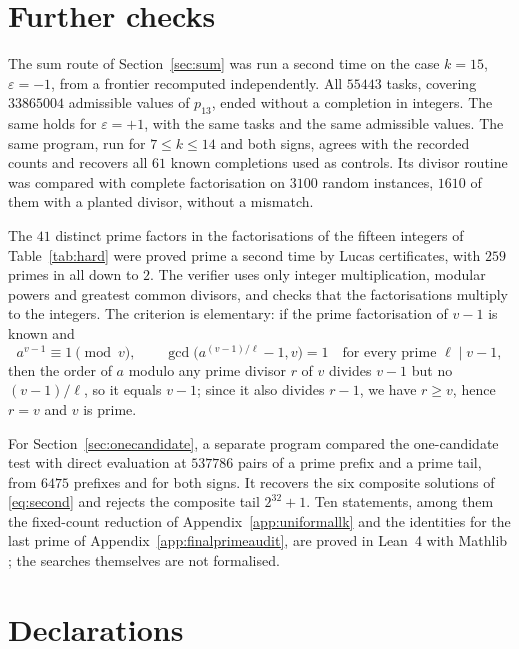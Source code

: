 \documentclass[11pt,reqno]{amsart}
\numberwithin{equation}{section}
\theoremstyle{plain}
\theoremstyle{definition}
\theoremstyle{remark}
\begin{document}
\section{Further checks}\label{app:revisionchecks}
The sum route of Section~\ref{sec:sum} was run a second time on the
case $k=15$, $\varepsilon=-1$, from a frontier recomputed independently.
All $55443$ tasks, covering $33865004$ admissible values of $p_{13}$,
ended without a completion in integers. The same holds for
$\varepsilon=+1$, with the same tasks and the same admissible values.
The same program, run for $7\le k\le14$ and both signs, agrees with
the recorded counts and recovers all $61$ known completions used as
controls. Its
divisor routine was compared with complete factorisation on $3100$
random instances, $1610$ of them with a planted divisor, without a
mismatch.

The $41$ distinct prime factors in the factorisations of the fifteen
integers of Table~\ref{tab:hard} were proved prime a second time by
Lucas certificates, with $259$ primes in all down to $2$. The verifier
uses only integer multiplication, modular powers and greatest common
divisors, and checks that the factorisations multiply to the
integers. The criterion is elementary: if the prime factorisation of
$v-1$ is known and
\[
 a^{v-1}\equiv1\pmod v,\qquad
 \gcd\bigl(a^{(v-1)/\ell}-1,v\bigr)=1
       \quad\text{for every prime }\ell\mid v-1,
\]
then the order of $a$ modulo any prime divisor $r$ of $v$ divides
$v-1$ but no $(v-1)/\ell$, so it equals $v-1$; since it also divides
$r-1$, we have $r\ge v$, hence $r=v$ and $v$ is prime.

For Section~\ref{sec:onecandidate}, a separate program compared the
one-candidate test with direct evaluation at $537786$ pairs of a prime
prefix and a prime tail, from $6475$ prefixes and for both signs. It
recovers the six composite solutions of \eqref{eq:second} and rejects
the composite tail $2^{32}+1$. Ten statements, among them the
fixed-count reduction of Appendix~\ref{app:uniformallk} and the
identities for the last prime of Appendix~\ref{app:finalprimeaudit},
are proved in Lean~4
\cite{dMU21} with Mathlib \cite{Mathlib}; the searches themselves are
not formalised.




\section*{Declarations}
\end{document}
